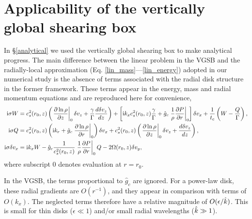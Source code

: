 \section{Applicability of the vertically global shearing box}\label{global_corr}
In \S\ref{analytical} we used the vertically global shearing box
\citep[VGSB,][]{mcnally14} to make analytical progress. %
The main difference between the linear problem in the VGSB 
and the radially-local approximation
(Eq. \ref{lin_mass}---\ref{lin_energy}) adopted in our numerical study
is the absence of  terms associated with the radial disk structure in
the former framework. These terms appear in the energy, mass and radial momentum
equations and are reproduced here for convenience,
\begin{align}
  \mathrm{i} \sigma W  &=c _s^2(r_0, z)\left( \left.\frac{\partial\ln\rho}{\partial
      z}\right|_0 \delta v_z + \frac{\gamma}{\Gamma} \frac{d\delta
    v_z}{dz}\right) + \left[\mathrm{i} k_xc_s^2(r_0,z)
  \frac{\gamma}{\Gamma} + \hat{g}_c\left.\frac{1}{\rho}\frac{\partial P}{\partial
      r}\right|_0\right]\delta v_x  +
\frac{1}{t_c}\left(W-\frac{Q}{\Gamma}\right),\label{gcorr_terms1}\\
\mathrm{i} \sigma Q &= c_s^2(r_0,z)\left(\mathrm{i} k_r + \hat{g}_c
  \left.\frac{\partial\ln{\rho}}{\partial r}\right|_0\right)\delta v_x + c _s^2(r_0, z)\left( \left.\frac{\partial\ln\rho}{\partial
      z}\right|_0 \delta v_z + \frac{d\delta
    v_z}{dz}\right),\label{gcorr_terms2} \\
\mathrm{i} \sigma \delta v_x & = \mathrm{i} k_x W  -
\hat{g}_c\frac{1}{c_s^2(r_0,z)}\left.\frac{1}{\rho}\frac{\partial P}{\partial
  r}\right|_0Q - 2\Omega(r_0,z)\delta v_y,\label{gcorr_terms3}
\end{align}
where subscript $0$ denotes evaluation at $r=r_0$.

In the VGSB, the terms proportional to $\hat{g}_c$ are ignored. For a
power-law disk, these radial gradients are $O(r^{-1})$, and they
appear in comparison with terms of $O(k_x)$. The neglected terms 
therefore have a relative magnitude of $O(\epsilon/\hat{k})$. This is
small for thin disks ($\epsilon\ll1$) and/or small radial wavelengths
($\hat{k}\gg 1$). 


